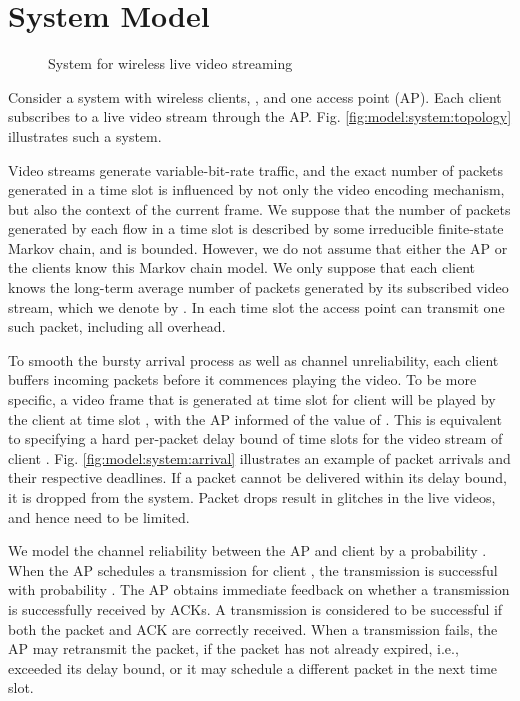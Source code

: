 \documentclass[10pt,nocopyrightspace]{sigplan-proc-varsize-1in}
\begin{document}
\section{System Model}  \label{section:model}
\begin{figure}[t]
\caption{System for wireless live video streaming}\label{fig:model:system}
\end{figure}


Consider a system with  wireless clients, , and one access point (AP). Each client subscribes to a live video stream through the AP. Fig. \ref{fig:model:system:topology} illustrates such a system. 

Video streams generate variable-bit-rate traffic, and the exact number of packets generated in a time slot is influenced by not only the video encoding mechanism, but also the context of the current frame. We suppose that the number of packets generated by each flow in a time slot is described by some irreducible finite-state Markov chain, and is bounded. However, we do not assume that either the AP or the clients know this Markov chain model. We only suppose that each client  knows the long-term average number of packets generated by its subscribed video stream, which we denote by .  In each time slot the access point can transmit one such packet, including all overhead.

To smooth the bursty arrival process as well as channel unreliability, each client buffers incoming packets before it commences playing the video. To be more specific, a video frame that is generated at time slot  for client  will be played by the client at time slot , with the AP informed of the value of . This is equivalent to specifying a hard per-packet delay bound of  time slots for the video stream of client . Fig. \ref{fig:model:system:arrival} illustrates an example of packet arrivals and their respective deadlines. If a packet cannot be delivered within its delay bound, it is dropped from the system. Packet drops result in glitches in the live videos, and hence need to be limited.

We model the channel reliability between the AP and client  by a probability . When the AP schedules a transmission for client , the transmission is successful with probability . The AP obtains immediate feedback on whether a transmission is successfully received by ACKs. A transmission is considered to be successful if both the packet and ACK are correctly received. When a transmission fails, the AP may retransmit the packet, if the packet has not already expired, i.e., exceeded its delay bound, or it may schedule a different packet in the next time slot.
\end{document}
